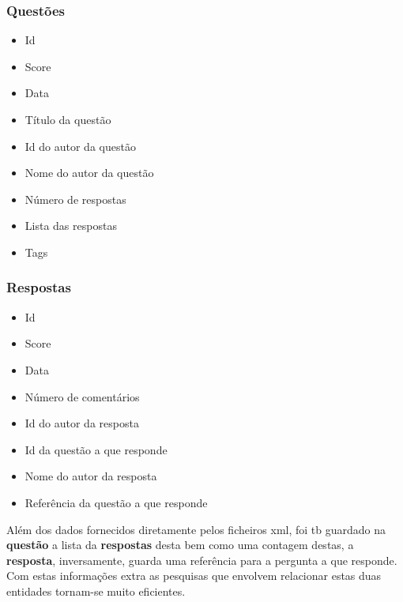 \documentclass[10pt,a4paper]{article}
\begin{document}
        \subsubsection{Questões}
        \begin{multicols}{2}
        \begin{itemize}
            \item Id
            \item Score
            \item Data
            \item Título da questão
            \item Id do autor da questão
            \item Nome do autor da questão
            \item Número de respostas
            \item Lista das respostas
            \item Tags
        \end{itemize}
        \end{multicols}

        \subsubsection{Respostas}
        \begin{multicols}{2}
        \begin{itemize}
            \item Id
            \item Score
            \item Data
            \item Número de comentários
            \item Id do autor da resposta
            \item Id da questão a que responde
            \item Nome do autor da resposta
            \item Referência da questão a que responde
        \end{itemize}
        \end{multicols}
    Além dos dados fornecidos diretamente pelos ficheiros xml, foi tb guardado na
    \textbf{questão} a lista da \textbf{respostas} desta bem como uma contagem
    destas, a \textbf{resposta}, inversamente, guarda uma referência para a
    pergunta a que responde. Com estas informações extra as pesquisas que
    envolvem relacionar estas duas entidades tornam-se muito eficientes.
\end{document}
